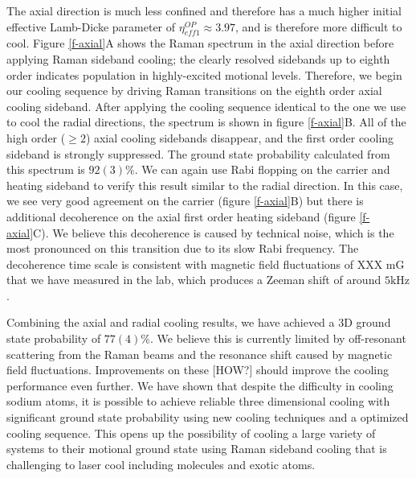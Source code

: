 \documentclass[aps,prl,twocolumn,groupedaddress]{revtex4-1}
\begin{document}
The axial direction is much less confined and therefore has a much higher initial effective
Lamb-Dicke parameter of $\eta^{OP}_{eff1}\approx 3.97$, and is therefore more difficult to cool.
Figure \ref{f-axial}A shows the Raman spectrum in the axial direction
before applying Raman sideband cooling; the clearly resolved sidebands
up to eighth order indicates population in highly-excited motional levels.
Therefore, we begin our cooling sequence by driving Raman transitions on the eighth order axial
cooling sideband. After applying the cooling sequence identical to the one we use to cool
the radial directions, the spectrum is shown in figure \ref{f-axial}B.
All of the high order ($\geqslant2$) axial cooling sidebands disappear, and the first order
cooling sideband is strongly suppressed.
The ground state probability calculated from this spectrum is $92(3)\%$.
We can again use Rabi flopping on the carrier and heating sideband to verify this result
similar to the radial direction. In this case, we see very good agreement on the carrier
(figure \ref{f-axial}B) but there is additional decoherence on the axial first order
heating sideband (figure \ref{f-axial}C).
We believe this decoherence is caused by technical noise, which is the most pronounced 
on this transition due to its slow Rabi frequency.
The decoherence time scale is consistent with magnetic field fluctuations of XXX mG that we have measured in the lab, which produces
a Zeeman shift of around $5\text{kHz}$.


Combining the axial and radial cooling results,
we have achieved a 3D ground state probability of $77(4)\%$.
We believe this is currently limited by off-resonant scattering from the Raman beams
and the resonance shift caused by magnetic field fluctuations.
Improvements on these [HOW?] should improve the cooling performance even further.
We have shown that despite the difficulty in cooling sodium atoms,
it is possible to achieve reliable three dimensional cooling with significant ground state
probability using new cooling techniques and a optimized cooling sequence.
This opens up the possibility of cooling a large variety of systems to their motional ground
state using Raman sideband cooling that is challenging to laser cool
including molecules and exotic atoms.



\end{document}

